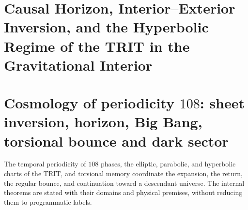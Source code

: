 \chapter{Causal Horizon, Interior--Exterior Inversion, and the Hyperbolic Regime of the TRIT in the Gravitational Interior}
\label{chap:md-horizonte-inversion-trit}



\chapter{Cosmology of periodicity \texorpdfstring{\(108\)}{108}: sheet inversion, horizon, Big Bang, torsional bounce and dark sector}
\label{chap:md-cosmologia-periodicidad-108-definitiva}
The temporal periodicity of \(108\) phases, the elliptic, parabolic, and
hyperbolic charts of the TRIT, and torsional memory coordinate the expansion, the return,
the regular bounce, and continuation toward a descendant universe. The
internal theorems are stated with their domains and physical premises, without
reducing them to programmatic labels.



\begingroup
\let\HMTOwnerSection\section
\let\HMTOwnerSubsection\subsection
\let\HMTOwnerSubsubsection\subsubsection
\let\HMTOwnerParagraph\paragraph
\let\chapter\HMTOwnerSection
\let\section\HMTOwnerSubsection
